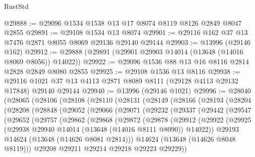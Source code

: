 \begin{lexlean}{RustStd}
\begin{coremodule}
@29888 := @29096 @1534 @1538 @13 @17 @8074 @8119 @8126 @2849 @8047 @2855
@29891 := @29108 @1534 @13 @8074
@29901 := @29116 @162 @37 @13 @7476 @2871 @8055 @8069 @29136 @29140 @29144
@29903 := @13996 (@29146 @162)
@29912 := @29888 (@29891 (@29901 @29903 @14014 (@13648 (@14016 @8069 @8056)) @14022))
@29922 := @29096 @1536 @88 @13 @16 @8116 @2814 @2828 @2849 @8080 @2855
@29925 := @29108 @1536 @13 @8116
@29938 := @29116 @1021 @37 @13 @4113 @2871 @8089 @8111 (@29128 @4113 @29132 @17848) @29140 @29144
@29940 := @13996 (@29146 @1021)
@29996 := @28040
    (@28065
      (@28106
        (@28108
          (@28110
            (@28131
              (@28149
                (@28166
                  (@28193
                    (@28204
                      (@28208
                        (@28848
                          (@29052
                            (@29066
                              (@29071
                                (@29232
                                  (@29337
                                    (@29442
                                      (@29547
                                        (@29652
                                          (@29757
                                            (@29862
                                              (@29868
                                                (@29872
                                                  (@29878
                                                    (@29912
                                                      (@29922
                                                        (@29925
                                                          (@29938
                                                            @29940
                                                            @14014
                                                            (@13648 (@14016 @8111 @8090))
                                                            @14022))
                                                        @29193
                                                        @14624
                                                        (@13648 (@14626 @8081 @2814)))
                                                      @14624
                                                      (@13648 (@14626 @8048 @8119)))
                                                    @29208
                                                    @29211
                                                    @29214
                                                    @29218
                                                    @29223
                                                    @29229))

\end{coremodule}
\end{lexlean}
